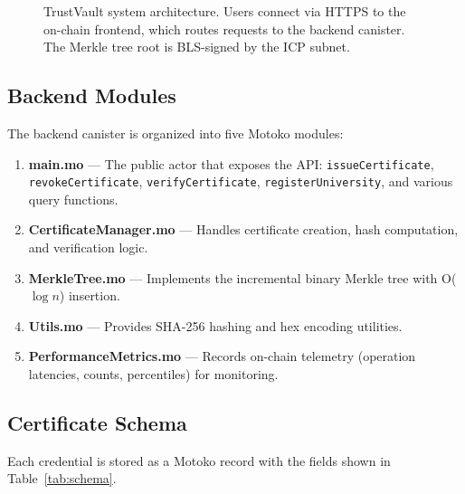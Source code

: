\documentclass[conference]{IEEEtran}
\begin{document}
\begin{figure}[t]
\caption{TrustVault system architecture. Users connect via HTTPS to the on-chain frontend, which routes requests to the backend canister. The Merkle tree root is BLS-signed by the ICP subnet.}
\label{fig:sysarch}
\end{figure}

\subsection{Backend Modules}

The backend canister is organized into five Motoko modules:

\begin{enumerate}
  \item \textbf{main.mo} — The public actor that exposes the API: \texttt{issueCertificate}, \texttt{revokeCertificate}, \texttt{verifyCertificate}, \texttt{registerUniversity}, and various query functions.
  \item \textbf{CertificateManager.mo} — Handles certificate creation, hash computation, and verification logic.
  \item \textbf{MerkleTree.mo} — Implements the incremental binary Merkle tree with O($\log n$) insertion.
  \item \textbf{Utils.mo} — Provides SHA-256 hashing and hex encoding utilities.
  \item \textbf{PerformanceMetrics.mo} — Records on-chain telemetry (operation latencies, counts, percentiles) for monitoring.
\end{enumerate}

\subsection{Certificate Schema}

Each credential is stored as a Motoko record with the fields shown in Table~\ref{tab:schema}.
\end{document}
